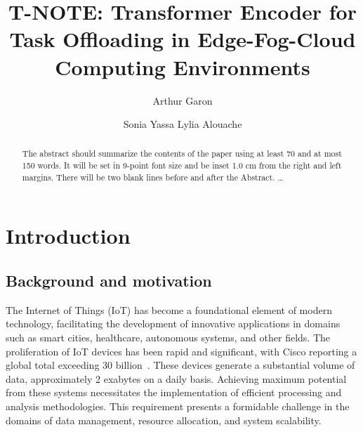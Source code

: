 \documentclass{svproc}
\begin{document}
\mainmatter              %
%
\title{T-NOTE: Transformer Encoder for Task Offloading in Edge-Fog-Cloud Computing Environments}
%
%
\author{Arthur Garon \and Sonia Yassa
Lylia Alouache}
%
%
%

\maketitle              %

\begin{abstract}
The abstract should summarize the contents of the paper
using at least 70 and at most 150 words. It will be set in 9-point
font size and be inset 1.0 cm from the right and left margins.
There will be two blank lines before and after the Abstract. \dots
\end{abstract}
%


\section{Introduction}\label{sec:introduction}

\subsection{Background and motivation}\label{subsec:background}


The Internet of Things (IoT) has become a foundational element of modern technology, facilitating the development of innovative applications in domains such as smart cities, healthcare, autonomous systems, and other fields. The proliferation of IoT devices has been rapid and significant, with Cisco reporting a global total exceeding 30 billion~\cite{benaboura_comprehensive_nodate}. These devices generate a substantial volume of data, approximately 2 exabytes on a daily basis. Achieving maximum potential from these systems necessitates the implementation of efficient processing and analysis methodologies. This requirement presents a formidable challenge in the domains of data management, resource allocation, and system scalability.
\end{document}
